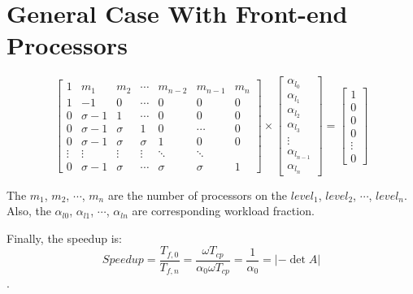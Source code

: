 \section{General Case With Front-end Processors}
\begin{equation}
{
\left[ \begin{array}{ccccccc}
1 & m_{1} & m_{2} & \cdots & m_{n-2} & m_{n-1} & m_{n}\\
1 & -1 & 0 & \cdots& 0 & 0 & 0\\
0 & \sigma -1 & 1 & \cdots & 0 & 0 & 0 \\
0 & \sigma -1 & \sigma & 1 & 0 & \cdots & 0 \\
0 & \sigma -1 & \sigma & \sigma & 1 & 0 & 0 \\
\vdots & \vdots & \vdots  &   \vdots & \ddots & \ddots\\
0 & \sigma -1 & \sigma & \cdots & \sigma & \sigma & 1
\end{array} 
\right ]} \times \left[ \begin{array}{c}
\alpha_{l_{0}} \\
\alpha_{l_{1}} \\
\alpha_{l_{2}} \\
\alpha_{l_{3}} \\
\vdots \\
\alpha_{l_{n-1}}\\
\alpha_{l_{n}}
\end{array} 
\right ] = \left[ \begin{array}{c}
1 \\
0 \\
0 \\
0 \\
\vdots \\
0
\end{array} 
\right ]
\end{equation}

The $m_{1}$, $m_{2}$, $\cdots$, $m_{n}$ are the number of processors on the $level_{1}$, $level_{2}$, $\cdots$, $level_{n}$.   Also, the $\alpha_{l0}$, $\alpha_{l1}$,  $\cdots$, $\alpha_{ln}$ are corresponding workload fraction.  

Finally, the speedup is:
$$Speedup = \frac{T_{f, 0}}{T_{f, n}}= \frac{\omega T_{cp}}{\alpha_{0}\omega T_{cp}} = \frac{1}{\alpha_{0}} = \left | -\det A \right |$$.
\newpage 

